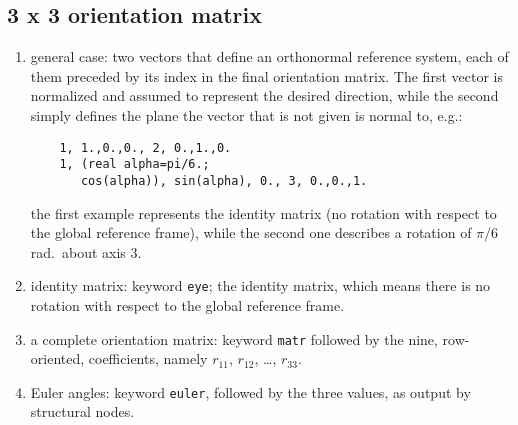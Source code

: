 \subsection{3 x 3 orientation matrix}
\begin{enumerate}
    \item general case: two vectors that define an orthonormal reference
    system, each of them preceded by its index in the final orientation 
    matrix. The first vector is normalized and assumed to represent the
    desired direction, while the second simply defines the plane the
    vector that is not given is normal to, e.g.:
    \begin{verbatim}
    1, 1.,0.,0., 2, 0.,1.,0.
    1, (real alpha=pi/6.; 
       cos(alpha)), sin(alpha), 0., 3, 0.,0.,1.
    \end{verbatim}
    the first example represents the identity matrix (no rotation 
    with respect to the global reference frame),
    while the second one describes a rotation of $ \pi/6 $ rad.\ about
    axis 3.
    \item identity matrix: keyword \texttt{eye}; the identity matrix,
    which means there is no rotation with respect to the global reference
    frame.
    \item a complete orientation matrix: keyword \texttt{matr}
    followed by the nine, row-oriented, coefficients, namely
    $ r_{11} $, $ r_{12} $, \ldots, $ r_{33} $.
    \item Euler angles: keyword \texttt{euler}, followed by the three
    values, as output by structural nodes.
\end{enumerate}
